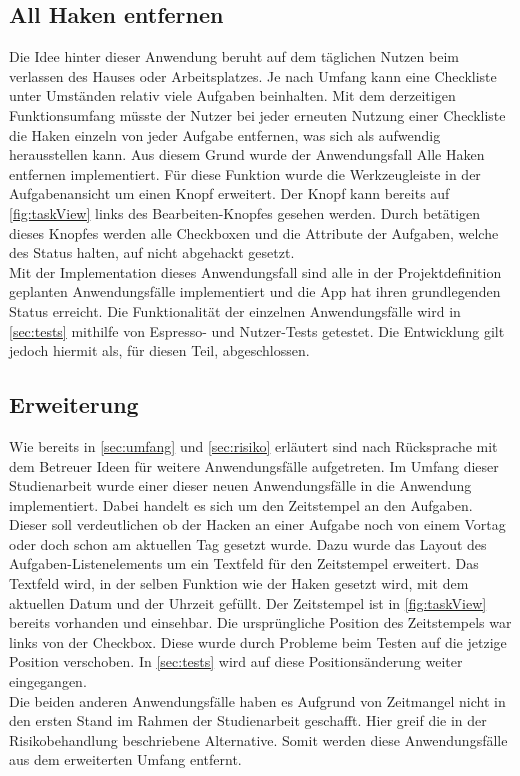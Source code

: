 
\subsection{All Haken entfernen}\label{subsec:Haken}
Die Idee hinter dieser Anwendung beruht auf dem täglichen Nutzen beim verlassen des Hauses oder Arbeitsplatzes. Je nach Umfang kann eine Checkliste unter Umständen relativ viele Aufgaben beinhalten. Mit dem derzeitigen Funktionsumfang müsste der Nutzer bei jeder erneuten Nutzung einer Checkliste die Haken einzeln von jeder Aufgabe entfernen, was sich als aufwendig herausstellen kann. Aus diesem Grund wurde der Anwendungsfall \glqq Alle Haken entfernen\grqq{} implementiert. Für diese Funktion wurde die Werkzeugleiste in der Aufgabenansicht um einen Knopf erweitert. Der Knopf kann bereits auf \autoref{fig:taskView} links des Bearbeiten-Knopfes gesehen werden. Durch betätigen dieses Knopfes werden alle Checkboxen und die Attribute der Aufgaben, welche des Status halten, auf nicht abgehackt gesetzt.\\
Mit der Implementation dieses Anwendungsfall sind alle in der Projektdefinition geplanten Anwendungsfälle implementiert und die App hat ihren grundlegenden Status erreicht. Die Funktionalität der einzelnen Anwendungsfälle wird in \autoref{sec:tests} mithilfe von Espresso- und Nutzer-Tests getestet. Die Entwicklung gilt jedoch hiermit als, für diesen Teil, abgeschlossen.

\subsection{Erweiterung}\label{subsec:erweiterung}
Wie bereits in \autoref{sec:umfang} und \autoref{sec:risiko} erläutert sind nach Rücksprache mit dem Betreuer Ideen für weitere Anwendungsfälle aufgetreten. Im Umfang dieser Studienarbeit wurde einer dieser neuen Anwendungsfälle in die Anwendung implementiert. Dabei handelt es sich um den Zeitstempel an den Aufgaben. Dieser soll verdeutlichen ob der Hacken an einer Aufgabe noch von einem Vortag oder doch schon am aktuellen Tag gesetzt wurde. Dazu wurde das Layout des Aufgaben-Listenelements um ein Textfeld für den Zeitstempel erweitert. Das Textfeld wird, in der selben Funktion wie der Haken gesetzt wird, mit dem aktuellen Datum und der Uhrzeit gefüllt. Der Zeitstempel ist in \autoref{fig:taskView} bereits vorhanden und einsehbar. Die ursprüngliche Position des Zeitstempels war links von der Checkbox. Diese wurde durch Probleme beim Testen auf die jetzige Position verschoben. In \autoref{sec:tests} wird auf diese Positionsänderung weiter eingegangen.\\
Die beiden anderen Anwendungsfälle haben es Aufgrund von Zeitmangel nicht in den ersten Stand im Rahmen der Studienarbeit geschafft. Hier greif die in der Risikobehandlung beschriebene Alternative. Somit werden diese Anwendungsfälle aus dem erweiterten Umfang entfernt.

